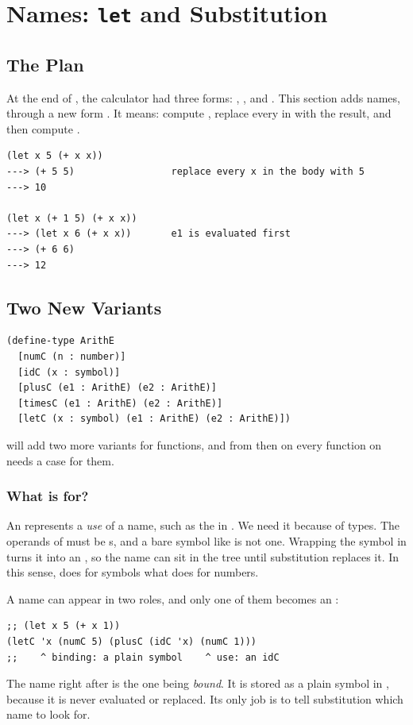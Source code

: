 \section{Names: \texttt{let} and Substitution}
\label{sec:letsubst}

\subsection{The Plan}

At the end of , the calculator had three forms: , , and . This section adds names, through a new form . It means: compute , replace every  in  with the result, and then compute .
\begin{lstlisting}[style=repl]
(let x 5 (+ x x))
---> (+ 5 5)                 replace every x in the body with 5
---> 10

(let x (+ 1 5) (+ x x))
---> (let x 6 (+ x x))       e1 is evaluated first
---> (+ 6 6)
---> 12
\end{lstlisting}

\subsection{Two New Variants}

\begin{lstlisting}
(define-type ArithE
  [numC (n : number)]
  [idC (x : symbol)]
  [plusC (e1 : ArithE) (e2 : ArithE)]
  [timesC (e1 : ArithE) (e2 : ArithE)]
  [letC (x : symbol) (e1 : ArithE) (e2 : ArithE)])
\end{lstlisting}
 will add two more variants for functions, and from then on every function on  needs a case for them.

\subsubsection{What is  for?} An  represents a \emph{use} of a name, such as the  in . We need it because of types. The operands of  must be s, and a bare symbol like  is not one. Wrapping the symbol in  turns it into an , so the name can sit in the tree until substitution replaces it. In this sense,  does for symbols what  does for numbers.

A name can appear in two roles, and only one of them becomes an :
\begin{lstlisting}
;; (let x 5 (+ x 1))
(letC 'x (numC 5) (plusC (idC 'x) (numC 1)))
;;    ^ binding: a plain symbol    ^ use: an idC
\end{lstlisting}
The name right after  is the one being \emph{bound}. It is stored as a plain symbol in , because it is never evaluated or replaced. Its only job is to tell substitution which name to look for.

